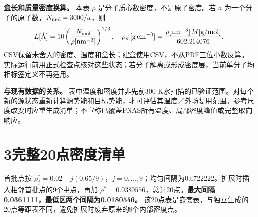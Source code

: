\documentclass[a4paper]{ctexart}
\begin{document}
\textbf{盒长和质量密度换算。} 本表 $\rho$ 是分子质心数密度，不是原子密度。若 $a$ 为一个分子的原子数，$N_{\rm mol}=3000/a$，则
\[
L[\text{\AA}]=10\left(\frac{N_{\rm mol}}{\rho[\mathrm{nm}^{-3}]}\right)^{1/3},\quad
\rho_m[\mathrm{g\,cm}^{-3}]=\frac{\rho[\mathrm{nm}^{-3}]\,M[\mathrm{g/mol}]}{602.214076}.
\]
CSV保留未舍入的密度、温度和盒长；建盒使用CSV，不从PDF三位小数反算。实际运行前用正式检查点核对这些状态；若分子解离或形成密度层，当前单分子均相标签定义不再适用。

\textbf{与现有数据的关系。} 表中温度和密度并非先前300 K水扫描的已验证范围。对每个新的源状态重新计算源势能和目标势能，才可评估其温度／外场复用范围。参考尺度改变时应重生成清单；不宣称已覆盖PNAS所有温度、局部密度峰值或完整取向响应。

\clearpage
\section*{3\quad 完整20点密度清单}
首批点按 $\rho_j^*=0.02+j(0.65/9)$，$j=0,\ldots,9$；均匀间隔为0.0722222。扩展时插入相邻首批点的9个中点，再加 $\rho^*=0.0380556$，总计20点。\textbf{最大间隔0.0361111，最低区两个间隔为0.0180556。} 该20点表是嵌套表，与独立生成的20点等距表不同，避免扩展时废弃原来的8个内部密度点。
\end{document}
